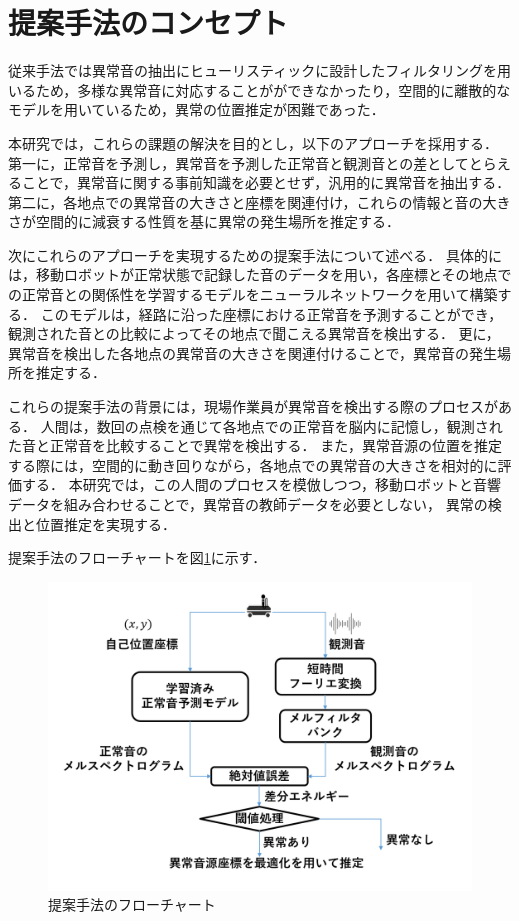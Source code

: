 \documentclass[../main]{subfiles}
\begin{document}
\section{提案手法のコンセプト}
\label{sec:pmethod_concept}
従来手法では異常音の抽出にヒューリスティックに設計したフィルタリングを用いるため，多様な異常音に対応することがができなかったり，空間的に離散的なモデルを用いているため，異常の位置推定が困難であった．

本研究では，これらの課題の解決を目的とし，以下のアプローチを採用する．
第一に，正常音を予測し，異常音を予測した正常音と観測音との差としてとらえることで，異常音に関する事前知識を必要とせず，汎用的に異常音を抽出する．
第二に，各地点での異常音の大きさと座標を関連付け，これらの情報と音の大きさが空間的に減衰する性質を基に異常の発生場所を推定する．


次にこれらのアプローチを実現するための提案手法について述べる．
具体的には，移動ロボットが正常状態で記録した音のデータを用い，各座標とその地点での正常音との関係性を学習するモデルをニューラルネットワークを用いて構築する．
このモデルは，経路に沿った座標における正常音を予測することができ，観測された音との比較によってその地点で聞こえる異常音を検出する．
更に，異常音を検出した各地点の異常音の大きさを関連付けることで，異常音の発生場所を推定する．

これらの提案手法の背景には，現場作業員が異常音を検出する際のプロセスがある．
人間は，数回の点検を通じて各地点での正常音を脳内に記憶し，観測された音と正常音を比較することで異常を検出する．
また，異常音源の位置を推定する際には，空間的に動き回りながら，各地点での異常音の大きさを相対的に評価する．
本研究では，この人間のプロセスを模倣しつつ，移動ロボットと音響データを組み合わせることで，異常音の教師データを必要としない，
異常の検出と位置推定を実現する．

提案手法のフローチャートを図\ref{fig:flowchart}に示す．


\begin{figure}[t]
  \centering
  \includegraphics[keepaspectratio, width=1.0\linewidth]{chap3/flowchart_proposed_method.png}
  \caption{提案手法のフローチャート}
  \label{fig:flowchart}
\end{figure}
\end{document}
